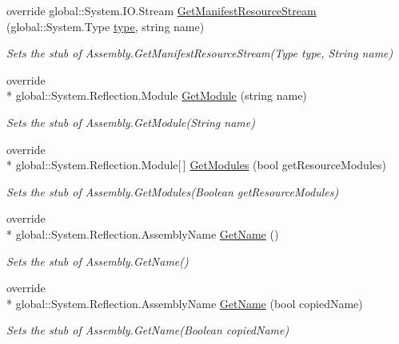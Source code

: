 \begin{DoxyCompactItemize}
override global\-::\-System.\-I\-O.\-Stream \hyperlink{class_system_1_1_reflection_1_1_fakes_1_1_stub_assembly_a45fe2b29e12962f126a13ff5cc9b5917}{Get\-Manifest\-Resource\-Stream} (global\-::\-System.\-Type \hyperlink{jquery-1_810_82-vsdoc_8js_a3940565e83a9bfd10d95ffd27536da91}{type}, string name)
\begin{DoxyCompactList}\small\item\em Sets the stub of Assembly.\-Get\-Manifest\-Resource\-Stream(\-Type type, String name)\end{DoxyCompactList}\item 
override \\*
global\-::\-System.\-Reflection.\-Module \hyperlink{class_system_1_1_reflection_1_1_fakes_1_1_stub_assembly_a49c194b8e5bcd2e154221a1b1decedd3}{Get\-Module} (string name)
\begin{DoxyCompactList}\small\item\em Sets the stub of Assembly.\-Get\-Module(\-String name)\end{DoxyCompactList}\item 
override \\*
global\-::\-System.\-Reflection.\-Module\mbox{[}$\,$\mbox{]} \hyperlink{class_system_1_1_reflection_1_1_fakes_1_1_stub_assembly_a3ba9ebf4f6814ff814dd0db8523ab79e}{Get\-Modules} (bool get\-Resource\-Modules)
\begin{DoxyCompactList}\small\item\em Sets the stub of Assembly.\-Get\-Modules(\-Boolean get\-Resource\-Modules)\end{DoxyCompactList}\item 
override \\*
global\-::\-System.\-Reflection.\-Assembly\-Name \hyperlink{class_system_1_1_reflection_1_1_fakes_1_1_stub_assembly_ac176ebe1f26d577f20540daf3eb4e592}{Get\-Name} ()
\begin{DoxyCompactList}\small\item\em Sets the stub of Assembly.\-Get\-Name()\end{DoxyCompactList}\item 
override \\*
global\-::\-System.\-Reflection.\-Assembly\-Name \hyperlink{class_system_1_1_reflection_1_1_fakes_1_1_stub_assembly_a3023cef393eb1dee15584a0ccce2a441}{Get\-Name} (bool copied\-Name)
\begin{DoxyCompactList}\small\item\em Sets the stub of Assembly.\-Get\-Name(\-Boolean copied\-Name)\end{DoxyCompactList}\item 

\end{DoxyCompactItemize}
